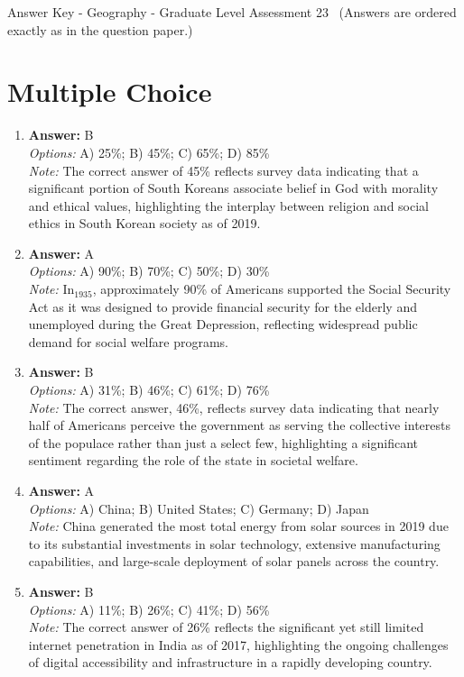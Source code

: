 \documentclass[12pt]{article}
\begin{document}
\begin{center}
Answer Key - Geography - Graduate Level Assessment 23 \
\small (Answers are ordered exactly as in the question paper.)
\end{center}

\section*{Multiple Choice}
\begin{enumerate}[label=\arabic*.]
\item \textbf{Answer:} B
\\ \textit{Options:} A) 25\%; B) 45\%; C) 65\%; D) 85\%
\\ \textit{Note:} The correct answer of 45\% reflects survey data indicating that a significant portion of South Koreans associate belief in God with morality and ethical values, highlighting the interplay between religion and social ethics in South Korean society as of 2019.
\item \textbf{Answer:} A
\\ \textit{Options:} A) 90\%; B) 70\%; C) 50\%; D) 30\%
\\ \textit{Note:} In$_{1935}$, approximately 90\% of Americans supported the Social Security Act as it was designed to provide financial security for the elderly and unemployed during the Great Depression, reflecting widespread public demand for social welfare programs.
\item \textbf{Answer:} B
\\ \textit{Options:} A) 31\%; B) 46\%; C) 61\%; D) 76\%
\\ \textit{Note:} The correct answer, 46\%, reflects survey data indicating that nearly half of Americans perceive the government as serving the collective interests of the populace rather than just a select few, highlighting a significant sentiment regarding the role of the state in societal welfare.
\item \textbf{Answer:} A
\\ \textit{Options:} A) China; B) United States; C) Germany; D) Japan
\\ \textit{Note:} China generated the most total energy from solar sources in 2019 due to its substantial investments in solar technology, extensive manufacturing capabilities, and large-scale deployment of solar panels across the country.
\item \textbf{Answer:} B
\\ \textit{Options:} A) 11\%; B) 26\%; C) 41\%; D) 56\%
\\ \textit{Note:} The correct answer of 26\% reflects the significant yet still limited internet penetration in India as of 2017, highlighting the ongoing challenges of digital accessibility and infrastructure in a rapidly developing country.
\end{enumerate}
\end{document}
